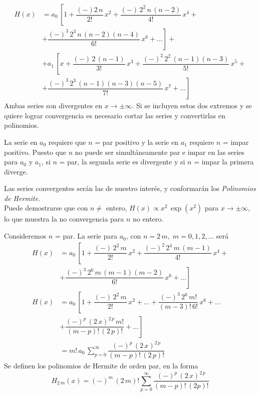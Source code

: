 \begin{align*}
H(x) &= a_{0} \, \left[ 1 + \dfrac{(-) 2 \, n}{2!}\, x^{2} + \dfrac{(-) \, 2^{2} \, n \, (n - 2)}{4!}\, x^{4} + \right. \\
&+ \left. \dfrac{(-)^{3} \, 2^{3} \, n \, (n-2)(n-4) }{6!}\, x^{6} + \ldots \right] + \\
&+ a_{1} \, \left[ x + \dfrac{(-) \, 2 \, (n-1)}{3!} \, x^{3} + \dfrac{(-)^{2} \, 2^{2} \, (n-1)(n-3)}{5!}\, x^{5} + \right.\\
&+ \left. \dfrac{(-)^{3} \, 2^{3} \, (n-1)(n-3)(n-5)}{7!} \, x^{7} + \ldots \right]
\end{align*}
Ambas series son divergentes en $x \to \pm \infty$. Si se incluyen estos dos extremos y se quiere lograr convergencia es necesario cortar las series y convertirlas en polinomios.
\par
La serie en $a_{0}$ requiere que $n$ = par positivo y la serie en $a_{1}$ requiere $n$ = impar positivo. Puesto que $n$ no puede ser simultáneamente par e impar en las series para $a_{0}$ y $a_{1}$, si $n$ = par, la segunda serie es divergente y si $n$ = impar la primera diverge.
\par
Las series convergentes serán las de nuestro interés, y conformarán los \emph{Polinomios de Hermite}.
\\
Puede demostrarse que con $n \neq$ entero, $H(x) \propto x^{2} \, \exp(x^{2})$ para $x \to \pm \infty$, lo que muestra la no convergencia para $n$ no entero.
\par
Consideremos $n$ = par. La serie para $a_{0}$, con $n=2\, m, \; m = 0, 1, 2, \ldots$ será
\begin{align*}
H(x) &= a_{0} \, \left[ 1 + \dfrac{(-) \, 2^{2} \, m}{2!} \, x^{2} + \dfrac{(-)^{2} \, 2^{4} \, m \, (m - 1)}{4!} \, x^{4} + \right. \\
&+ \left. \dfrac{(-)^{3} \, 2^{6} \, m \, (m-1)(m-2)}{6!} \, x^{6} + \ldots \right] \\[1em]
H(x) &= a_{0}\, \left[ 1 + \dfrac{(-)\, 2^{2}\, m}{2!} \, x^{2} + \ldots + \dfrac{(-)^{3} \, 2^{6}\, m!}{(m-3)! \, 6!} \, x^{6} + \ldots \right. \\[0.5em]
&+ \left. \dfrac{(-)^{p} \, (2 \, x)^{2\, p}\, m!}{(m-p)! \, (2\, p)!} + \ldots \right] \\[0.5em]
&= m!\, a_{0} \, \sum_{p=0}^{\infty} \dfrac{(-)^{p}\, (2\, x)^{2\, p}}{(m-p)! \, (2\, p)!}
\end{align*}
Se definen los polinomios de Hermite de orden par, en la forma
\begin{equation}
H_{2\, m} (x) = (-)^{m} \, (2\, m)! \sum_{p=0}^{\infty} \dfrac{(-)^{p} \, (2\, x)^{2\, p}}{(m-p)!\, (2p)!}
\label{eq:ecuacion_08_60}
\end{equation}
